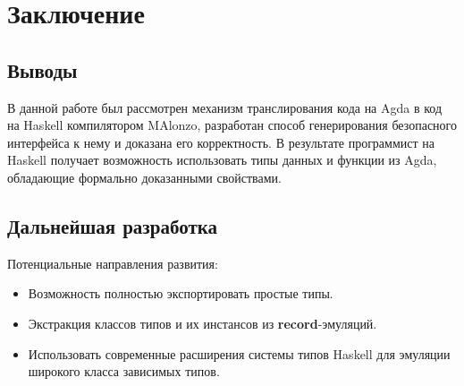 \section{Заключение}

\subsection{Выводы}

В данной работе был рассмотрен механизм транслирования кода на Agda в код на Haskell
компилятором MAlonzo, разработан способ генерирования безопасного интерфейса к нему и
доказана его корректность. В результате программист на Haskell получает возможность
использовать типы данных и функции из Agda, обладающие формально доказанными свойствами.

\subsection{Дальнейшая разработка}

Потенциальные направления развития:

\begin{itemize}
\item Возможность полностью экспортировать простые типы.
\item Экстракция классов типов и их инстансов из \textbf{record}-эмуляций.
\item Использовать современные расширения системы типов Haskell для эмуляции
      широкого класса зависимых типов.
\end{itemize}
